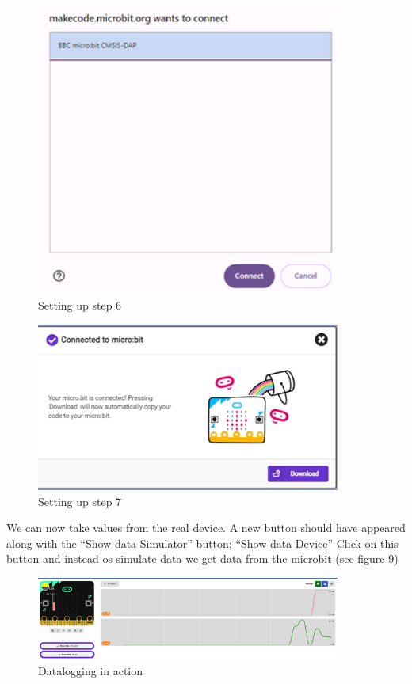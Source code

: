 \begin{figure}
    \centering
    \includegraphics[width=10cm]{chapters/ChapterP2-datalog/figures/datalog7.png}
    \caption{Setting up step 6}
    \label{fig:datalogstep6}
\end{figure}
\begin{figure}
    \centering
    \includegraphics[width=10cm]{chapters/ChapterP2-datalog/figures/datalog8.png}
    \caption{Setting up step 7}
    \label{fig:datalogstep7}
\end{figure}

We can now take values from the real device. A new button should have appeared along with the “Show data Simulator” button; “Show data Device” Click on this button and instead os simulate data we get data from the  microbit (see figure 9)

 
\begin{figure}
    \centering
    \includegraphics[width=10cm]{chapters/ChapterP2-datalog/figures/datalog9.png}
    \caption{Datalogging in action}
    \label{fig:datalogaction}
\end{figure}


